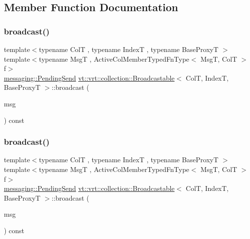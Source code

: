\subsection{Member Function Documentation}
\mbox{\label{structvt_1_1vrt_1_1collection_1_1_broadcastable_a0a08e1ab7c78e36b3ecb5b6a4d399dab}} 
\subsubsection{\texorpdfstring{broadcast()}{broadcast()}\hspace{0.1cm}{\footnotesize\ttfamily [1/6]}}
{\footnotesize\ttfamily template$<$typename ColT , typename IndexT , typename Base\+ProxyT $>$ \\
template$<$typename MsgT , Active\+Col\+Member\+Typed\+Fn\+Type$<$ Msg\+T, Col\+T $>$ f$>$ \\
\hyperlink{structvt_1_1messaging_1_1_pending_send}{messaging\+::\+Pending\+Send} \hyperlink{structvt_1_1vrt_1_1collection_1_1_broadcastable}{vt\+::vrt\+::collection\+::\+Broadcastable}$<$ ColT, IndexT, Base\+ProxyT $>$\+::broadcast (\begin{DoxyParamCaption}\item[{MsgT $\ast$}]{msg }\end{DoxyParamCaption}) const}

\mbox{\label{structvt_1_1vrt_1_1collection_1_1_broadcastable_a84e88085c04b2293e019faf986a4996a}} 
\subsubsection{\texorpdfstring{broadcast()}{broadcast()}\hspace{0.1cm}{\footnotesize\ttfamily [2/6]}}
{\footnotesize\ttfamily template$<$typename ColT , typename IndexT , typename Base\+ProxyT $>$ \\
template$<$typename MsgT , Active\+Col\+Member\+Typed\+Fn\+Type$<$ Msg\+T, Col\+T $>$ f$>$ \\
\hyperlink{structvt_1_1messaging_1_1_pending_send}{messaging\+::\+Pending\+Send} \hyperlink{structvt_1_1vrt_1_1collection_1_1_broadcastable}{vt\+::vrt\+::collection\+::\+Broadcastable}$<$ ColT, IndexT, Base\+ProxyT $>$\+::broadcast (\begin{DoxyParamCaption}\item[{\hyperlink{namespacevt_ab2b3d506ec8e8d1540aede826d84a239}{Msg\+Shared\+Ptr}$<$ MsgT $>$}]{msg }\end{DoxyParamCaption}) const}

